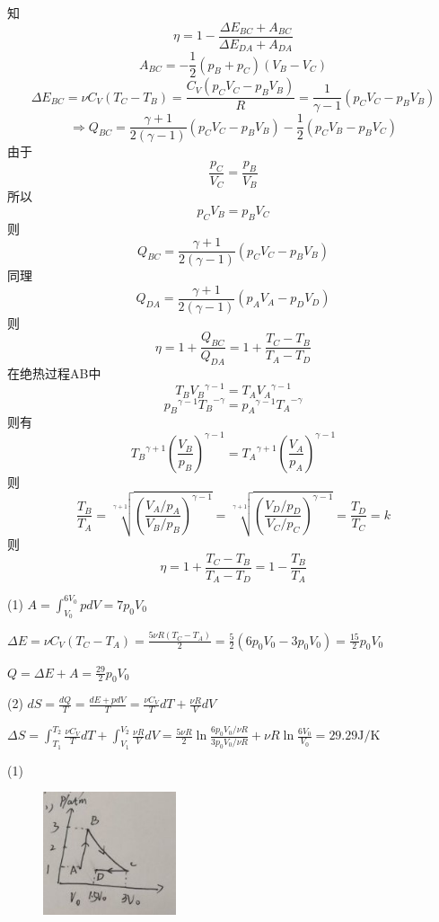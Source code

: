 \documentclass[b5paper,opensource]{./template/qyxf-book}
\begin{document}
知\[\eta  = 1 - \frac{{\Delta {E_{BC}} + {A_{BC}}}}{{\Delta {E_{DA}} + A{  _{DA}}}}\]
\[{A_{BC}} =  - \frac{1}{2}({p_B} + {p_C})({V_B} - {V_C})\]
\[\Delta {E_{BC}} = \nu {C_V}({T_C} - {T_B}) = \frac{{{C_V}({p_C}{V_C} - {p_B}{V_B})}}{R} = \frac{1}{{\gamma  - 1}}({p_C}{V_C} - {p_B}{V_B})\]
\[ \Rightarrow {Q_{BC}} = \frac{{\gamma  + 1}}{{2(\gamma  - 1)}}({p_C}{V_C} - {p_B}{V_B}) - \frac{1}{2}({p_C}{V_B} - {p_B}{V_C})\]
由于\[\frac{{{p_C}}}{{{V_C}}} = \frac{{{p_B}}}{{{V_B}}}\]
所以\[{p_C}{V_B} = {p_B}{V_C}\]
则\[{Q_{BC}} = \frac{{\gamma  + 1}}{{2(\gamma  - 1)}}({p_C}{V_C} - {p_B}{V_B})\]
同理\[{Q_{DA}} = \frac{{\gamma  + 1}}{{2(\gamma  - 1)}}({p_A}{V_A} - {p_D}{V_D})\]
则\[\eta  = 1 + \frac{{{Q_{BC}}}}{{{Q_{DA}}}} = 1 + \frac{{{T_C} - {T_B}}}{{{T_A} - {T_D}}}\]
在绝热过程AB中\[{T_B}{V_B}^{\gamma  - 1} = {T_A}{V_A}^{\gamma  - 1}\]
\[{p_B}^{\gamma  - 1}{T_B}^{ - \gamma } = {p_A}^{\gamma  - 1}{T_A}^{ - \gamma }\]
则有\[{T_B}^{\gamma+1}{(\frac{{{V_B}}}{{{p_B}}})^{\gamma  - 1}} = {T_A}^{\gamma  + 1}{(\frac{{{V_A}}}{{{p_A}}})^{\gamma  - 1}}\]
则\[\frac{{{T_B}}}{{{T_A}}} = \sqrt[{\gamma+1}]{{{{\left(\frac{V_A/p_A}{V_B/p_B}\right)}^{\gamma  - 1}}}} = \sqrt[{\gamma  + 1}]{{{{\left(\frac{V_D/p_D}{V_C/p_C}\right)}^{\gamma-1}}}} = \frac{{{T_D}}}{{{T_C}}}=k\]
则\[\eta  = 1 + \frac{T_C-T_B}{T_A-T_D} = 1 - \frac{T_B}{T_A}\]


\solve

(1)
$A = \int_{{V_0}}^{6{V_0}} pdV=7{p_0}{V_0}$

$\Delta E = \nu {C_V}({T_C} - {T_A}) = \frac{{5\nu R({T_C} - {T_A})}}{2} = \frac{5}{2}(6{p_0}{V_0} - 3{p_0}{V_0}) = \frac{{15}}{2}{p_0}{V_0}$

$Q = \Delta E + A = \frac{{29}}{2}{p_0}{V_0}$

(2)
$dS = \frac{{dQ}}{T} = \frac{{dE + pdV}}{T} = \frac{{\nu {C_V}}}{T}dT + \frac{{\nu R}}{V}dV$

\therefore $ \Delta S = \int_{{T_1}}^{{T_2}} {\frac{{\nu {C_V}}}{T}dT + \int_{{V_1}}^{{V_2}} {\frac{{\nu R}}{V}dV}  = } \frac{{5\nu R}}{2}\ln \frac{{6{p_0}{V_0}/\nu R}}{{3{p_0}{V_0}/\nu R}} + \nu R\ln \frac{{6{V_0}}}{{{V_0}}} = 29.29\mathrm{J/K}$


\solve
(1)
\begin{figure}[!h]
	\centering
	\includegraphics[width=0.35\textwidth]{Chp11_23.jpeg}
\end{figure}
\end{document}
